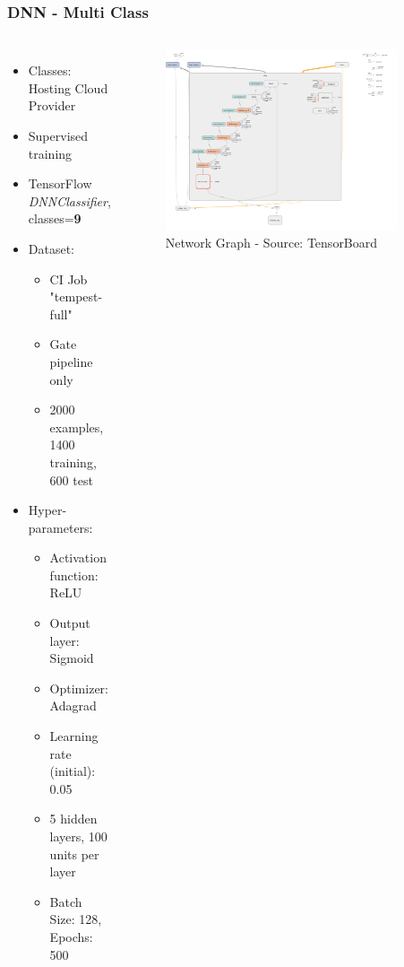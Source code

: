 \documentclass[aspectratio=169,11pt,hyperref={colorlinks=true}]{beamer}
\begin{document}
\begin{frame}
    \frametitle{DNN - Multi Class}
    \begin{columns}
        \begin{itemize}
            \item{Classes: Hosting Cloud Provider}
            \item{Supervised training}
            \item{TensorFlow \emph{DNNClassifier}, classes=\textbf{9}}
            \item{Dataset:}
            \begin{itemize}
              \item{CI Job "tempest-full"}
              \item{Gate pipeline only}
              \item{2000 examples, 1400 training, 600 test}
            \end{itemize}
            \item{Hyper-parameters:}
            \begin{itemize}
              \item{Activation function: ReLU}
              \item{Output layer: Sigmoid}
              \item{Optimizer: Adagrad}
              \item{Learning rate (initial): 0.05}
              \item{5 hidden layers, 100 units per layer}
              \item{Batch Size: 128, Epochs: 500}
            \end{itemize}
        \end{itemize}
        \begin{figure}
        \begin{center}
          \includegraphics[width=0.9\textwidth]{diagrams/binary_class_network_diagram.png}
             \caption{Network Graph - Source: TensorBoard}
        \end{center}
        \end{figure}
    \end{columns}
\end{frame}
\end{document}
